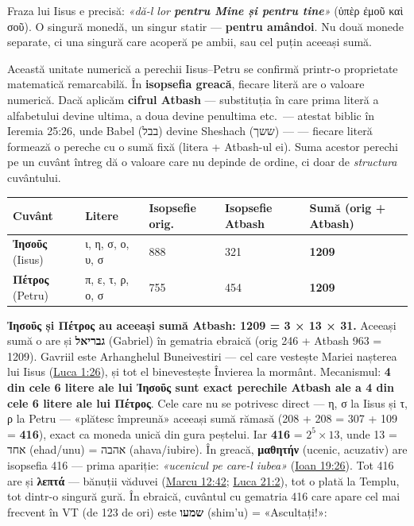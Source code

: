 \documentclass[12pt,a4paper,twoside,openany]{book}
\begin{document}
Fraza lui Iisus e precisă: \textit{«dă-l lor \textbf{pentru Mine și pentru tine}»} (ὑπὲρ ἐμοῦ καὶ σοῦ). O singură monedă, un singur statir — \textbf{pentru amândoi}. Nu două monede separate, ci una singură care acoperă pe ambii, sau cel puțin aceeași sumă.

Această unitate numerică a perechii Iisus–Petru se confirmă printr-o proprietate matematică remarcabilă. În \textbf{isopsefia greacă}, fiecare literă are o valoare numerică. Dacă aplicăm \textbf{cifrul Atbash} — substituția în care prima literă a alfabetului devine ultima, a doua devine penultima etc.\ --- atestat biblic în Ieremia 25:26, unde Babel (בבל) devine Sheshach (ששך) --- — fiecare literă formează o pereche cu o sumă fixă (litera + Atbash-ul ei). Suma acestor perechi pe un cuvânt întreg dă o valoare care nu depinde de ordine, ci doar de \textit{structura} cuvântului.

\begin{center}
\small
\begin{tabular}{L{2.8cm}L{3.2cm}C{2.5cm}C{2.2cm}C{3cm}}
\toprule
{}
\textbf{Cuvânt} & \textbf{Litere} & \textbf{Isopsefie orig.} & \textbf{Isopsefie Atbash} & \textbf{Sumă (orig + Atbash)} \\
\midrule
\textbf{Ἰησοῦς} (Iisus) & ι, η, σ, ο, υ, σ & 888 & 321 & \textbf{\textcolor{primary}{1209}} \\
\textbf{Πέτρος} (Petru) & π, ε, τ, ρ, ο, σ & 755 & 454 & \textbf{\textcolor{primary}{1209}} \\
\bottomrule
\end{tabular}
\end{center}

\textbf{\textcolor{primary}{Ἰησοῦς și Πέτρος au aceeași sumă Atbash: 1209 = 3 × 13 × 31.}} Aceeași sumă o are și \textbf{גבריאל} (Gabriel) în gematria ebraică (orig 246 + Atbash 963 = 1209). Gavriil este Arhanghelul Buneivestiri --- cel care vestește Mariei nașterea lui Iisus (\href{https://bibliaortodoxa.ro/carte.php?id=48\&cap=1\#26}{Luca 1:26}), și tot el binevestește Învierea la mormânt.
Mecanismul: \textbf{4 din cele 6 litere ale lui Ἰησοῦς sunt exact perechile Atbash ale a 4 din cele 6 litere ale lui Πέτρος}. Cele care nu se potrivesc direct --- η, σ la Iisus și τ, ρ la Petru --- «plătesc împreună» aceeași sumă rămasă (208 + 208 = 307 + 109 = \textbf{416}), exact ca moneda unică din gura peștelui. Iar \textbf{416} = $2^5 \times 13$, unde 13 = אחד (ehad/unu) = אהבה (ahava/iubire). În greacă, \textbf{μαθητήν} (ucenic, acuzativ) are isopsefia 416 --- prima apariție: \textit{«ucenicul pe care-l iubea»} (\href{https://bibliaortodoxa.ro/carte.php?id=35\&cap=19\#26}{Ioan 19:26}). Tot 416 are și \textbf{λεπτά} --- bănuții văduvei (\href{https://bibliaortodoxa.ro/carte.php?id=53\&cap=12\#42}{Marcu 12:42}; \href{https://bibliaortodoxa.ro/carte.php?id=48\&cap=21\#2}{Luca 21:2}), tot o plată la Templu, tot dintr-o singură gură. În ebraică, cuvântul cu gematria 416 care apare cel mai frecvent în VT (de 123 de ori) este \textbf{שמעו} (shim'u) = «Ascultați!»:
\end{document}
